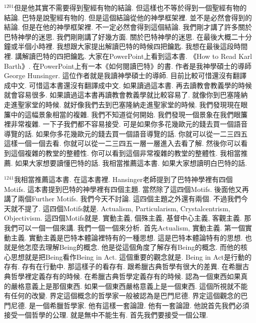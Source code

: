 \documentclass{book}
\begin{document}
$^{1201}$但是他其實不需要得到聖經有物的結論.
但這樣也不等於得到一個聖經有物的結論.
巴特是說聖經有物的.
但是這個結論從他的神學框架裡.
並不是必然會得到的結論.
但是在他的神學框架裡.
不一定必然會得到這個結論.
我們剛才講了許多關於巴特神學的迷思.
我們剛剛講了好幾方面.
關於巴特神學的迷思.
在最後大概二十分鐘或半個小時裡.
我想跟大家提出解讀巴特的時候四把鑰匙.
我想在最後這段時間裡.
講解讀巴特的四把鑰匙.
大家在PowerPoint上看到這本書.
《How to Read Karl Barth》.
在PowerPoint上有一本《如何閱讀巴特》的書.
作者是我神學碩士的導師George Hunsinger.
這位作者就是我讀神學碩士的導師.
目前比較可惜還沒有翻譯成中文.
可惜這本書還沒有翻譯成中文.
如果讀過這本書.
再去讀教會教義學的時候就會容易很多.
如果讀過這本書再讀教會教義學就比較容易了.
就像你到巴塞隆納走進聖家堂的時候.
就好像我們去到巴塞隆納走進聖家堂的時候.
我們發現現在眼簾中的這幅景象相當的複雜.
我們不知道從何開始.
我們發現一個景象在我們眼簾裡非常複雜.
一下子我們都不容易接受.
可是如果你多花幾歐元的錢去買一個語音導覽的話.
如果你多花幾歐元的錢去買一個語音導覽的話.
你就可以從一二三四五這樣一個一個去看.
你就可以從一二三四五一層一層進入去看了解.
然後你可以看到這個複雜的教堂的整體性.
你可以看到這個非常複雜的教堂的整體性.
我相當推薦.
如果大家想要讀懂巴特的話.
我相當推薦這本書.
如果大家想讀明白巴特的話.

$^{1241}$我相當推薦這本書.
在這本書裡.
Hansinger老師提到了巴特神學裡有四個Motifs.
這本書提到巴特的神學裡有四個主題.
當然除了這四個Motifs.
後面他又再講了兩個Further Motifs.
我們今天不討論.
這四個主題之外還有兩個.
不過我們今天就不提了.
這四個Motifs就是.
Actualism, Particularism, Crystalcentrism, Objectivism.
這四個Motifs就是.
實動主義, 個殊主義, 基督中心主義, 客觀主義.
那我們可以一個一個來講.
我們一個一個來分析.
首先Actualism, 實動主義.
第一個實動主義.
實動主義是巴特本體論裡特有的一種思想.
這是巴特本體論特有的思想.
也就是他怎麼去理解Being的概念.
他是從這個角度了解存有Being的概念.
而他的核心思想就是把Being看作Being in Act.
這個重要的觀念就是.
Being in Act是行動的存有.
存有在行動中.
那這樣子的看存有.
跟希臘古典哲學有很大的差異.
在希臘古典哲學裡定義存有的時候.
在希臘古典哲學定義存有的時候.
認為一個東西如果真的嚴格意義上是那個東西.
如果一個東西嚴格意義上是一個東西.
這個所視就不能有任何的改變.
界定這個概念的哲學家一般被認為是巴門尼德.
界定這個觀念的巴門尼德.
是一個希臘哲學家.
他有這樣一套論證.
他有一套論證.
他說首先我們必須接受一個哲學的公理.
就是無中不能生有.
首先我們要接受一個公理.
\end{document}
